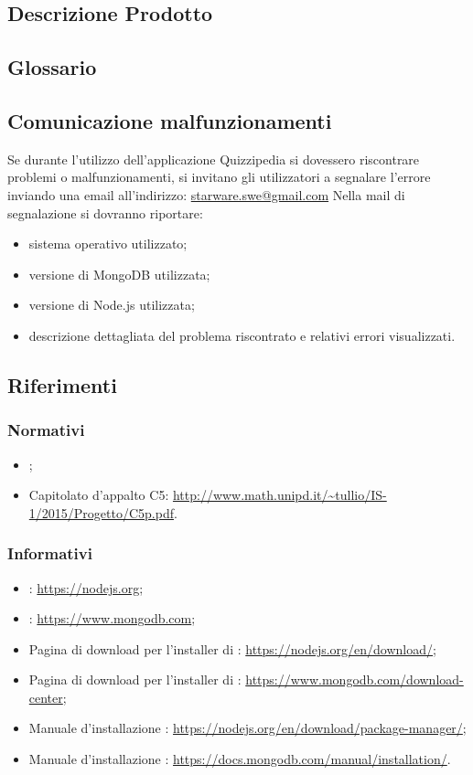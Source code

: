 \documentclass[12pt,a4paper]{article}
\begin{document}
	
	\subsection{Descrizione Prodotto}
	\descrizioneProdotto
	
	\subsection{Glossario}
	\glossarioPrint
	\subsection{Comunicazione malfunzionamenti}
		Se durante l’utilizzo dell’applicazione Quizzipedia si dovessero riscontrare problemi o malfunzionamenti, si invitano gli utilizzatori a segnalare l’errore inviando una email 		all’indirizzo:
		\url{starware.swe@gmail.com}
		Nella mail di segnalazione si dovranno riportare:
		\begin{itemize}
			\item sistema operativo utilizzato;
			\item versione di MongoDB utilizzata;
			\item versione di Node.js utilizzata;
			\item descrizione dettagliata del problema riscontrato e relativi errori visualizzati.
		\end{itemize}
	\subsection{Riferimenti}
	
	\subsubsection{Normativi}
	\begin{itemize}
		\item \NdPv{};
		\item Capitolato d'appalto C5: \url{http://www.math.unipd.it/~tullio/IS-1/2015/Progetto/C5p.pdf}.
	\end{itemize}	
	\subsubsection{Informativi}
	\begin{itemize}
		\item {}: \url{https://nodejs.org};
		\item {}: \url{https://www.mongodb.com};
		\item Pagina di download per l'installer di :
		\url{https://nodejs.org/en/download/};
		\item Pagina di download per l'installer di :
		\url{https://www.mongodb.com/download-center};
		\item Manuale d'installazione :
		\url{https://nodejs.org/en/download/package-manager/};
		\item Manuale d'installazione :
		\url{https://docs.mongodb.com/manual/installation/}.
		
	\end{itemize}	
	
\end{document}
